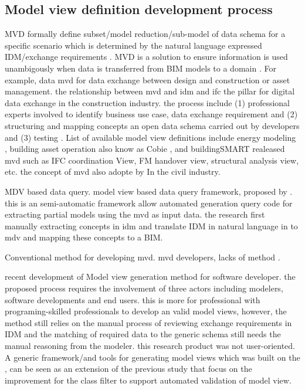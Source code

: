 \documentclass[Journal, InsideFigs, DoubleSpace]{ascelike} %
\begin{document}
\subsection{Model view definition development process}

MVD formally define subset/model reduction/sub-model of data schema for a specific scenario which is determined by the natural language expressed IDM/exchange requirements . MVD is a solution to ensure information is used unambigously when data is transferred from BIM models to a domain \cite{Jiang15}. For example, data mvd for data exchange between design and construction or asset management. the relationship between mvd and idm and ifc the pillar for digital data exchange in the construction industry. the process include (1) professional experts involved to identify business use case, data exchange requirement and (2) structuring and mapping concepts an open data schema carried out by developers and (3) testing \cite{venugopal12}. List of available model view definitions include energy modeling \cite{Jeong14}, building asset operation also know as Cobie \cite{east12,east07}, and buildingSMART  realeased mvd such as IFC coordination View, FM handover view, structural analysis view, etc. the concept of mvd also adopte by In the civil industry. 

MDV based data query.  model view based data query framework, proposed by \cite{jiang15}. this is an semi-automatic framework allow automated generation query code for extracting partial models using the mvd as input data. the research first manually extracting concepts in idm and translate IDM in natural language in to mdv and mapping these concepts to a BIM.

Conventional method for developing mvd. mvd developers, lacks of method \cite{zhang13}.

recent development of Model view generation method \cite{katranuschkov10} for software developer. the proposed process requires the involvement of three actors including modelers, software developments and end users. this is more for professional with programing-skilled professionals to develop an valid model views, however, the method still relies on the manual process of reviewing exchange requirements in IDM and the matching of required data to the generic schema still needs the manual reasoning from the modeler. this research product was not user-oriented. A generic framework/and tools for generating model views \cite{windisch12} which was built on the \cite{katranuschkov10}, can be seen as an extension of the previous study that focus on the improvement for the class filter to support automated validation of model view. 
\end{document}
